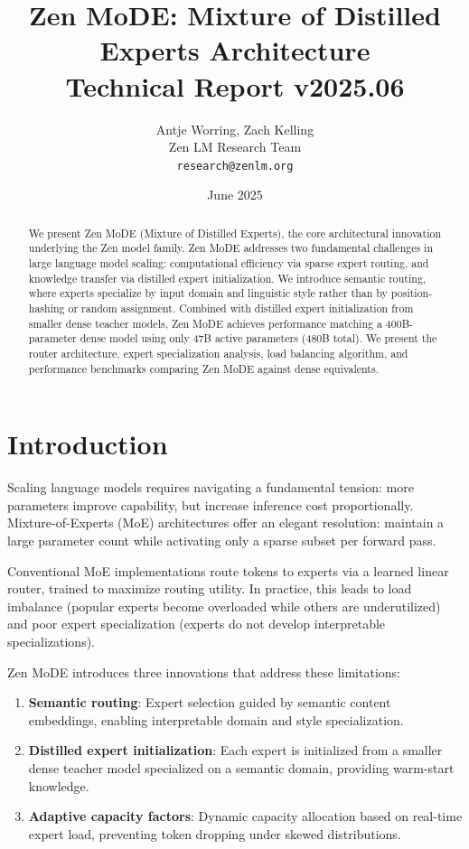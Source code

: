 \documentclass[11pt,a4paper]{article}
\title{\textbf{Zen MoDE: Mixture of Distilled Experts Architecture}\\
\large Technical Report v2025.06}
\author{Antje Worring, Zach Kelling \\ Zen LM Research Team\\
\texttt{research@zenlm.org}}
\date{June 2025}
\begin{document}
\maketitle

\begin{abstract}
We present Zen MoDE (Mixture of Distilled Experts), the core architectural innovation underlying the Zen model family. Zen MoDE addresses two fundamental challenges in large language model scaling: computational efficiency via sparse expert routing, and knowledge transfer via distilled expert initialization. We introduce semantic routing, where experts specialize by input domain and linguistic style rather than by position-hashing or random assignment. Combined with distilled expert initialization from smaller dense teacher models, Zen MoDE achieves performance matching a 400B-parameter dense model using only 47B active parameters (480B total). We present the router architecture, expert specialization analysis, load balancing algorithm, and performance benchmarks comparing Zen MoDE against dense equivalents.
\end{abstract}

\section{Introduction}

Scaling language models requires navigating a fundamental tension: more parameters improve capability, but increase inference cost proportionally. Mixture-of-Experts (MoE) architectures offer an elegant resolution: maintain a large parameter count while activating only a sparse subset per forward pass.

Conventional MoE implementations route tokens to experts via a learned linear router, trained to maximize routing utility. In practice, this leads to load imbalance (popular experts become overloaded while others are underutilized) and poor expert specialization (experts do not develop interpretable specializations).

Zen MoDE introduces three innovations that address these limitations:

\begin{enumerate}
  \item \textbf{Semantic routing}: Expert selection guided by semantic content embeddings, enabling interpretable domain and style specialization.
  \item \textbf{Distilled expert initialization}: Each expert is initialized from a smaller dense teacher model specialized on a semantic domain, providing warm-start knowledge.
  \item \textbf{Adaptive capacity factors}: Dynamic capacity allocation based on real-time expert load, preventing token dropping under skewed distributions.
\end{enumerate}
\end{document}
